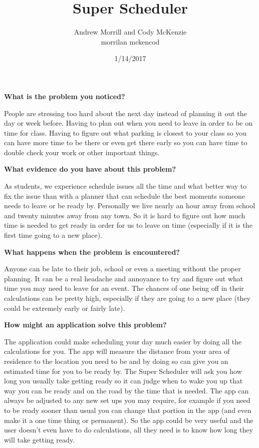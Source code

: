 \documentclass[12pt]{article}
\title{Super Scheduler}
\author{Andrew Morrill and Cody McKenzie \\ { morrilan \qquad \quad mckencod}}
\date{1/14/2017}
\begin{document}
\maketitle
	
	\begin{flushleft}
		\textbf{What is the problem you noticed?}
	\end{flushleft}

	People are stressing too hard about the next day instead of planning it out the day or week before.  Having to plan out when you need to leave in order to be on time for class.   Having to figure out what parking is closest to your class so you can have more time to be there or even get there early so you can have time to double check your work or other important things.\\
	
		
	\begin{flushleft}
		\textbf{What evidence do you have about this problem?}
	\end{flushleft}

	As students, we experience schedule issues all the time and what better way to fix the issue than with a planner that can schedule the best moments someone needs to leave or be ready by.  Personally we live nearly an hour away from school and twenty minutes away from any town.  So it is hard to figure out how much time is needed to get ready in order for us to leave on time (especially if it is the first time going to a new place). \\
	
	
	\begin{flushleft}
		\textbf{What happens when the problem is encountered?}
	\end{flushleft}

	Anyone can be late to their job, school or even a meeting without the proper planning.  It can be a real headache and annoyance to try and figure out what time you may need to leave for an event. The chances of one being off in their calculations can be pretty high, especially if they are going to a new place (they could be extremely early or fairly late). \\
	
	
	\begin{flushleft}
		\textbf{How might an application solve this problem?}
	\end{flushleft}

	The application could make scheduling your day much easier by doing all the calculations for you.  The app will measure the distance from your area of residence to the location you need to be and by doing so can give you an estimated time for you to be ready by.  The Super Scheduler will ask you how long you usually take getting ready so it can judge when to wake you up that way you can be ready and on the road by the time that is needed.  The app can always be adjusted to any new set ups you may require, for example if you need to be ready sooner than usual you can change that portion in the app (and even make it a one time thing or permanent).  So the app could be very useful and the user doesn't even have to do calculations, all they need is to know how long they will take getting ready. \\
	
\end{document}
